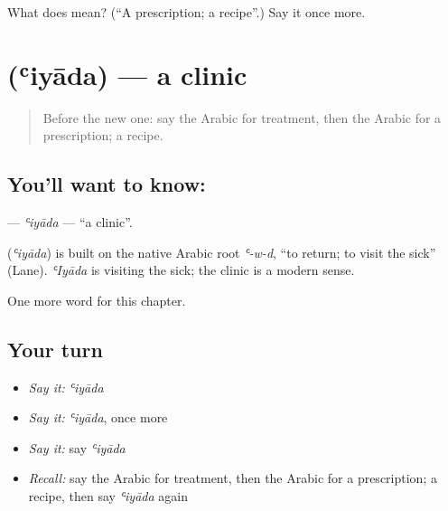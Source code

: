 \begin{tcolorbox}[breakable,colback=teal!4,colframe=teal!35!black,title={Before you move on}]
What does  mean? (\textquotedblleft{}A prescription; a recipe\textquotedblright{}.) Say it once more.
\end{tcolorbox}
\section[\texorpdfstring{\ar{عيادة} (ʿiyāda)}{عيادة (ʿiyāda)}]{ (ʿiyāda) — a clinic}

\label{lesson:AR-C231-iyada}



\begin{quote}
Before the new one: say the Arabic for treatment, then the Arabic for a prescription; a recipe.
\end{quote}

\subsection*{You'll want to know: }
\textbf{} — \emph{ʿiyāda} — \textquotedblleft{}a clinic\textquotedblright{}.

\begin{cousinweb}
\textbf{} (\emph{ʿiyāda}) is built on the native Arabic root \emph{ʿ-w-d}, \textquotedblleft{}to return; to visit the sick\textquotedblright{} (Lane). \emph{ʿIyāda} is visiting the sick; the clinic is a modern sense.
\end{cousinweb}

\begin{grammarlens}[title={What you've built}]
One more word for this chapter.
\end{grammarlens}

\subsection*{Your turn}
\begin{itemize}
\raggedright
  \item \emph{Say it:} \emph{ʿiyāda}
  \item \emph{Say it:} \emph{ʿiyāda}, once more
  \item \emph{Say it:} say \emph{ʿiyāda}
  \item \emph{Recall:} say the Arabic for treatment, then the Arabic for a prescription; a recipe, then say \emph{ʿiyāda} again
\end{itemize}

